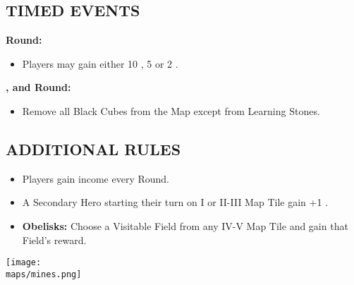 \begin{multicols*}{2}
\subsection*{\MakeUppercase{Timed Events}}
\textbf{ Round:}
\begin{itemize}
  \item Players may gain either 10 , 5  or 2 .
\end{itemize}
\textbf{,  and  Round:}
\begin{itemize}
  \item Remove all Black Cubes from the Map except from Learning Stones.
\end{itemize}
\subsection*{\MakeUppercase{Additional Rules}}
\begin{itemize}
  \item Players gain income every Round.
  \item A Secondary Hero starting their turn on I or II-III Map Tile gain +1 .
  \item \textbf{Obelisks:} Choose a Visitable Field from any IV-V Map Tile and gain that Field's reward.
\end{itemize}

\begin{center}
  \vfill
  \texttt{[image: \\maps/mines.png]}
  \vfill
\end{center}

\end{multicols*}
